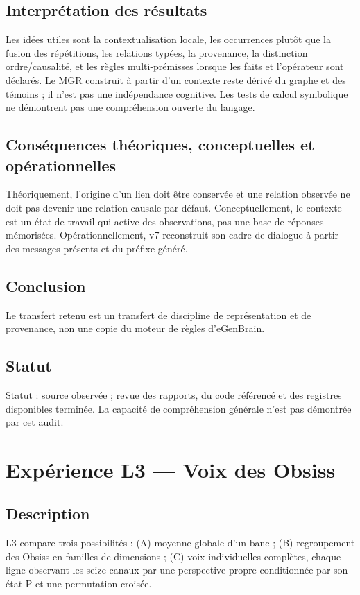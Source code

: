 \documentclass[11pt,a4paper]{report}
\begin{document}
\section{Interprétation des résultats}
Les idées utiles sont la contextualisation locale, les occurrences plutôt que la fusion des répétitions, les relations typées, la provenance, la distinction ordre/causalité, et les règles multi-prémisses lorsque les faits et l'opérateur sont déclarés. Le MGR construit à partir d'un contexte reste dérivé du graphe et des témoins ; il n'est pas une indépendance cognitive. Les tests de calcul symbolique ne démontrent pas une compréhension ouverte du langage.
\section{Conséquences théoriques, conceptuelles et opérationnelles}
Théoriquement, l'origine d'un lien doit être conservée et une relation observée ne doit pas devenir une relation causale par défaut. Conceptuellement, le contexte est un état de travail qui active des observations, pas une base de réponses mémorisées. Opérationnellement, v7 reconstruit son cadre de dialogue à partir des messages présents et du préfixe généré.
\section{Conclusion}
Le transfert retenu est un transfert de discipline de représentation et de provenance, non une copie du moteur de règles d'eGenBrain.
\section{Statut}
Statut : source observée ; revue des rapports, du code référencé et des registres disponibles terminée. La capacité de compréhension générale n'est pas démontrée par cet audit.

\chapter[L3 — Voix]{Expérience L3 — Voix des Obsiss}
\section{Description}
L3 compare trois possibilités : (A) moyenne globale d'un banc ; (B) regroupement des Obsiss en familles de dimensions ; (C) voix individuelles complètes, chaque ligne observant les seize canaux par une perspective propre conditionnée par son état P et une permutation croisée.
\end{document}
